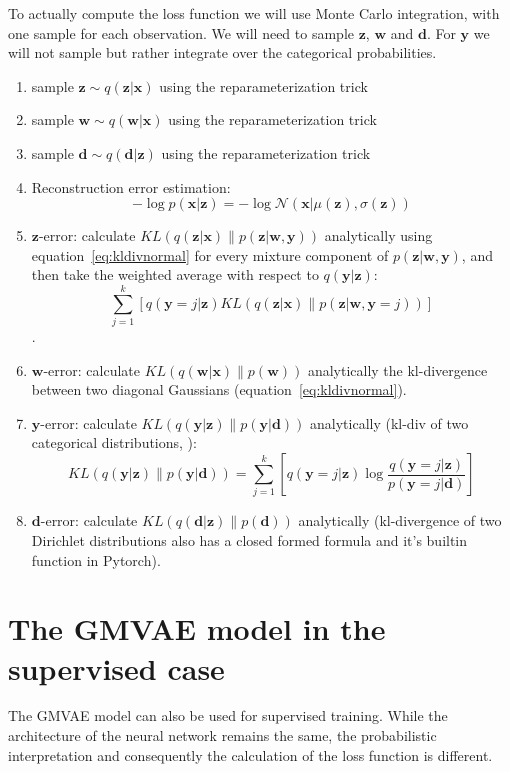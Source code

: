 \documentclass[11pt, a4paper]{report}
\theoremstyle{plain}
\theoremstyle{definition}
\theoremstyle{remark}
\newcommand{\x}{\mathbf{x}}
\newcommand{\z}{\mathbf{z}}
\newcommand{\y}{\mathbf{y}}
\newcommand{\w}{\mathbf{w}}
\newcommand{\dd}{\mathbf{d}}
\newcommand{\NN}{\mathcal{N}}
\begin{document}
To actually compute the loss function we will use Monte Carlo integration,
with one sample for each observation.
We will need to sample $\z$, $\w$ and $\dd$. For $\y$ we will not sample but
rather integrate over the categorical probabilities.


\begin{enumerate}
\item{sample} $\z \sim q(\z | \x)$ using the reparameterization trick
\item{sample} $\w \sim q(\w | \x)$ using the reparameterization trick
\item{sample} $\dd \sim q(\dd | \z)$ using the reparameterization trick
\item{Reconstruction error estimation}:
$$-\log p(\x | \z) = -\log \NN(\x | \mu(\z), \sigma(\z))$$
\item{$\z$-error}: calculate $KL(q(\z | \x) \| p(\z | \w, \y))$ analytically
using equation~\ref{eq:kldivnormal}
for every mixture component of $p(\z | \w, \y)$,
and then take the weighted average with respect
to $q(\y | \z)$:
$$\sum_{j=1}^k [ q(\y=j | \z) KL(q(\z | \x) \| p(\z | \w, \y=j))]$$.
\item{$\w$-error}: calculate $KL(q(\w | \x) \| p(\w))$ analytically 
the kl-divergence between two diagonal Gaussians (equation~\ref{eq:kldivnormal}).
\item{$\y$-error}:
calculate $KL(q(\y | \z) \| p(\y | \dd))$ analytically (kl-div of
two categorical distributions, ):
$$KL(q(\y | \z) \| p(\y | \dd)) = 
\sum_{j=1}^k [ q(\y=j | \z) \log \frac{q(\y=j | \z)}{p(\y = j | \dd)}]$$
\item{$\dd$-error}:
calculate $KL(q(\dd | \z) \| p(\dd))$ analytically
(kl-divergence of two Dirichlet distributions also has a closed formed
formula and it's builtin function in Pytorch).
\end{enumerate}

\section{The GMVAE model in the supervised case}

The GMVAE model can also be used for supervised training. While the
architecture of the neural network remains the same, the probabilistic
interpretation and consequently the calculation of the loss function is
different.
\end{document}
